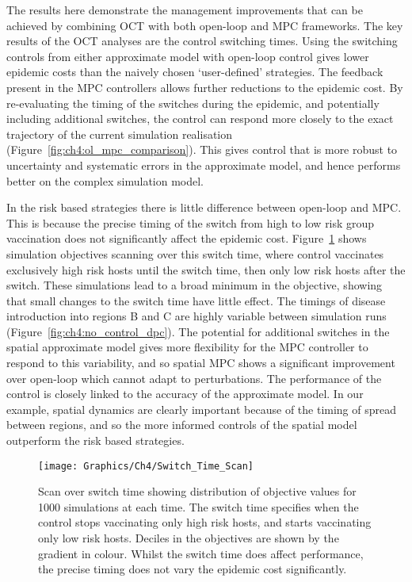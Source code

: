 The results here demonstrate the management improvements that can be achieved by combining OCT with both open-loop and MPC frameworks. The key results of the OCT analyses are the control switching times. Using the switching controls from either approximate model with open-loop control gives lower epidemic costs than the naively chosen `user-defined' strategies. The feedback present in the MPC controllers allows further reductions to the epidemic cost. By re-evaluating the timing of the switches during the epidemic, and potentially including additional switches, the control can respond more closely to the exact trajectory of the current simulation realisation (Figure~\ref{fig:ch4:ol_mpc_comparison}). This gives control that is more robust to uncertainty and systematic errors in the approximate model, and hence performs better on the complex simulation model.

In the risk based strategies there is little difference between open-loop and MPC\@. This is because the precise timing of the switch from high to low risk group vaccination does not significantly affect the epidemic cost. Figure~\ref{fig:ch4:switch_time_scan} shows simulation objectives scanning over this switch time, where control vaccinates exclusively high risk hosts until the switch time, then only low risk hosts after the switch. These simulations lead to a broad minimum in the objective, showing that small changes to the switch time have little effect. The timings of disease introduction into regions B and C are highly variable between simulation runs (Figure~\ref{fig:ch4:no_control_dpc}). The potential for additional switches in the spatial approximate model gives more flexibility for the MPC controller to respond to this variability, and so spatial MPC shows a significant improvement over open-loop which cannot adapt to perturbations. The performance of the control is closely linked to the accuracy of the approximate model. In our example, spatial dynamics are clearly important because of the timing of spread between regions, and so the more informed controls of the spatial model outperform the risk based strategies.

\begin{figure}[h]
    \begin{center}
        \texttt{[image: Graphics/Ch4/Switch\_Time\_Scan]}
        \caption[Effect of switch time on strategy performance]{Scan over switch time showing distribution of objective values for 1000 simulations at each time. The switch time specifies when the control stops vaccinating only high risk hosts, and starts vaccinating only low risk hosts. Deciles in the objectives are shown by the gradient in colour. Whilst the switch time does affect performance, the precise timing does not vary the epidemic cost significantly.}
        \label{fig:ch4:switch_time_scan}
    \end{center}
\end{figure}

